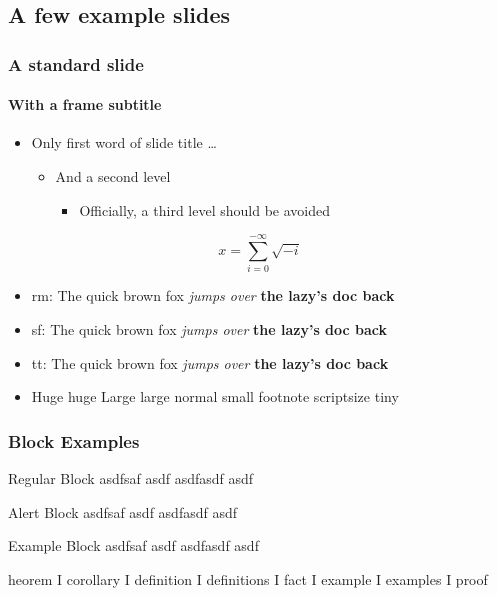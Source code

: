 \documentclass[9pt,aspectratio=169,classification=confidential]{appseceu2018}
\begin{document}
\subsection{A few example slides}
\frame{\sectionpage}
\begin{frame}[classification={confidential}]
  \frametitle{A standard slide}
  \framesubtitle{With a frame subtitle}
  \begin{itemize}
  \item Only first word of slide title \ldots
    \begin{itemize}
    \item  And a second level 
      \begin{itemize}
      \item  Officially, a third level should be avoided
      \end{itemize}
    \end{itemize}
  \end{itemize}
  \[ x = \sum_{i=0}^{-\infty}\sqrt{-i}\]
\begin{itemize}
\item rm: {\rmfamily The quick {\mdseries brown fox} \emph{jumps over} \textbf{the lazy's doc back}}
\item sf: {\sffamily The quick {\mdseries brown fox} \emph{jumps over} \textbf{the lazy's doc back}}
\item tt: {\ttfamily The quick {\mdseries brown fox} \emph{jumps over} \textbf{the lazy's doc back}}
\item {\Huge Huge} {\huge huge} {\Large Large} {\large large} {\normalsize normal} {\small small} 
      {\footnotesize footnote} {\scriptsize scriptsize} {\tiny tiny}
\end{itemize}
\end{frame}

\begin{frame}
\frametitle{Block Examples}
\begin{block}{Regular Block}
asdfsaf asdf asdfasdf asdf 
\end{block}
\begin{alertblock}{Alert Block}
asdfsaf asdf asdfasdf asdf 
\end{alertblock}
\begin{exampleblock}{Example Block}
asdfsaf asdf asdfasdf asdf 
\end{exampleblock}
heorem
I
corollary
I
definition
I
definitions
I
fact
I
example
I
examples
I
proof

\end{frame}
\end{document}
